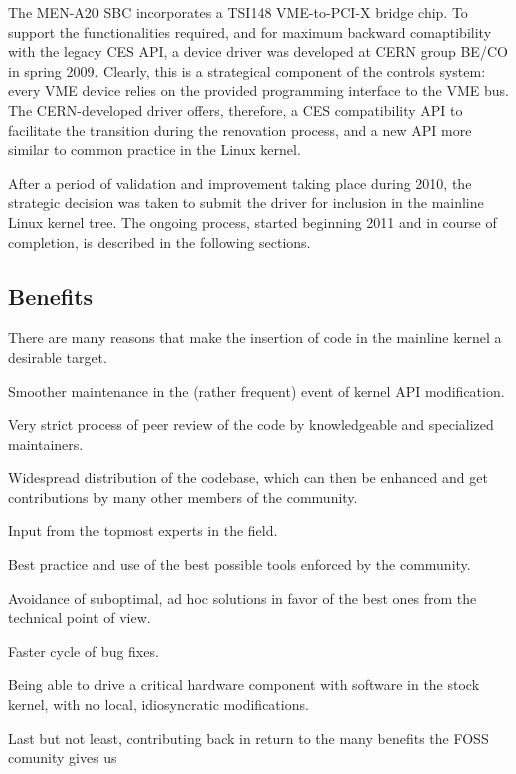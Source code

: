 \documentclass{JAC2003}
\begin{document}
The MEN-A20 SBC incorporates a TSI148 VME-to-PCI-X bridge chip.
To support the functionalities required, and for maximum backward
comaptibility with the legacy CES API, a device driver was developed 
at CERN group BE/CO in spring 2009. Clearly, this is a strategical
component of the controls system: every VME device relies on the
provided programming interface to the VME bus. The CERN-developed driver
offers, therefore, a CES compatibility API to facilitate the transition
during the renovation process, and a new API more similar to common
practice
in the Linux kernel.

After a period of validation and improvement taking place during 2010,
the strategic decision was taken to submit the driver for
inclusion in the mainline Linux kernel tree. The ongoing process, started
beginning 2011 and in course of completion, is described in the following
sections.

\subsection{Benefits}

There are many reasons that make the insertion of code in the mainline
kernel a desirable target.

\begin{Itemize}
\item Smoother maintenance in the (rather frequent) event of kernel API
    modification.
\item Very strict process of peer review of the code by knowledgeable
    and specialized maintainers.
\item Widespread distribution of the codebase, which can then be
    enhanced and get contributions by many other members of the community.
\item Input from the topmost experts in the field.
\item Best practice and use of the best possible tools enforced by
    the community.
\item Avoidance of suboptimal, ad hoc solutions in favor of the
    best ones from the technical point of view.
\item Faster cycle of bug fixes.
\item Being able to drive a critical hardware component with software
    in the stock kernel, with no local, idiosyncratic modifications.
    \label{stock}
\item Last but not least, contributing back in return to the many
    benefits the FOSS comunity gives us
\end{Itemize}
\end{document}
